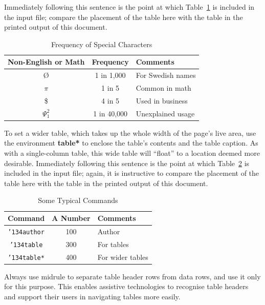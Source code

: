 \documentclass[sigplan,screen]{acmart}
\begin{document}
Immediately following this sentence is the point at which
Table~\ref{tab:freq} is included in the input file; compare the
placement of the table here with the table in the printed output of
this document.

\begin{table}
	\caption{Frequency of Special Characters}
	\label{tab:freq}
	\begin{tabular}{ccl}
		\toprule
		Non-English or Math & Frequency   & Comments          \\
		\midrule
		\O                  & 1 in 1,000  & For Swedish names \\
		$\pi$               & 1 in 5      & Common in math    \\
		\$                  & 4 in 5      & Used in business  \\
		$\Psi^2_1$          & 1 in 40,000 & Unexplained usage \\
		\bottomrule
	\end{tabular}
\end{table}

To set a wider table, which takes up the whole width of the page's
live area, use the environment \textbf{table*} to enclose the table's
contents and the table caption.  As with a single-column table, this
wide table will ``float'' to a location deemed more
desirable. Immediately following this sentence is the point at which
Table~\ref{tab:commands} is included in the input file; again, it is
instructive to compare the placement of the table here with the table
in the printed output of this document.

\begin{table}
	\caption{Some Typical Commands}
	\label{tab:commands}
	\begin{tabular}{ccl}
		\toprule
		Command                    & A Number & Comments         \\
		\midrule
		\texttt{{\char'134}author} & 100      & Author           \\
		\texttt{{\char'134}table}  & 300      & For tables       \\
		\texttt{{\char'134}table*} & 400      & For wider tables \\
		\bottomrule
	\end{tabular}
\end{table}

Always use midrule to separate table header rows from data rows, and
use it only for this purpose. This enables assistive technologies to
recognise table headers and support their users in navigating tables
more easily.
\end{document}
